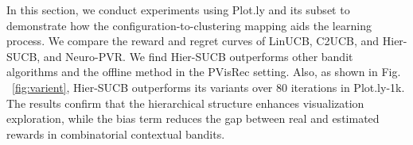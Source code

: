 
In this section, we conduct experiments using Plot.ly and its subset to demonstrate how the configuration-to-clustering mapping aids the learning process. We compare the reward and regret curves of LinUCB, C2UCB, and Hier-SUCB, and Neuro-PVR. We find Hier-SUCB outperforms other bandit algorithms and the offline method in the PVisRec setting. Also, as shown in Fig. ~\ref{fig:varient}, Hier-SUCB outperforms its variants over 80 iterations in Plot.ly-1k. The results confirm that the hierarchical structure enhances visualization exploration, while the bias term reduces the gap between real and estimated rewards in combinatorial contextual bandits.